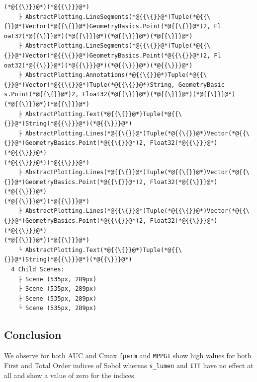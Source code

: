 \documentclass[12pt,a4paper]{article}
\begin{document}
\begin{lstlisting}
(*@{{\}}}@*)(*@{{\}}}@*)
    ├ AbstractPlotting.LineSegments(*@{{\{}}@*)Tuple(*@{{\{}}@*)Vector(*@{{\{}}@*)GeometryBasics.Point(*@{{\{}}@*)2, Fl
oat32(*@{{\}}}@*)(*@{{\}}}@*)(*@{{\}}}@*)(*@{{\}}}@*)
    ├ AbstractPlotting.LineSegments(*@{{\{}}@*)Tuple(*@{{\{}}@*)Vector(*@{{\{}}@*)GeometryBasics.Point(*@{{\{}}@*)2, Fl
oat32(*@{{\}}}@*)(*@{{\}}}@*)(*@{{\}}}@*)(*@{{\}}}@*)
    ├ AbstractPlotting.Annotations(*@{{\{}}@*)Tuple(*@{{\{}}@*)Vector(*@{{\{}}@*)Tuple(*@{{\{}}@*)String, GeometryBasic
s.Point(*@{{\{}}@*)2, Float32(*@{{\}}}@*)(*@{{\}}}@*)(*@{{\}}}@*)(*@{{\}}}@*)(*@{{\}}}@*)
    ├ AbstractPlotting.Text(*@{{\{}}@*)Tuple(*@{{\{}}@*)String(*@{{\}}}@*)(*@{{\}}}@*)
    ├ AbstractPlotting.Lines(*@{{\{}}@*)Tuple(*@{{\{}}@*)Vector(*@{{\{}}@*)GeometryBasics.Point(*@{{\{}}@*)2, Float32(*@{{\}}}@*)(*@{{\}}}@*)
(*@{{\}}}@*)(*@{{\}}}@*)
    ├ AbstractPlotting.Lines(*@{{\{}}@*)Tuple(*@{{\{}}@*)Vector(*@{{\{}}@*)GeometryBasics.Point(*@{{\{}}@*)2, Float32(*@{{\}}}@*)(*@{{\}}}@*)
(*@{{\}}}@*)(*@{{\}}}@*)
    ├ AbstractPlotting.Lines(*@{{\{}}@*)Tuple(*@{{\{}}@*)Vector(*@{{\{}}@*)GeometryBasics.Point(*@{{\{}}@*)2, Float32(*@{{\}}}@*)(*@{{\}}}@*)
(*@{{\}}}@*)(*@{{\}}}@*)
    └ AbstractPlotting.Text(*@{{\{}}@*)Tuple(*@{{\{}}@*)String(*@{{\}}}@*)(*@{{\}}}@*)
  4 Child Scenes:
    ├ Scene (535px, 289px)
    ├ Scene (535px, 289px)
    ├ Scene (535px, 289px)
    └ Scene (535px, 289px)
\end{lstlisting}


\subsection{Conclusion}
We observe for both AUC and Cmax \texttt{fperm} and \texttt{MPPGI} show high values for both First and Total Order indices of Sobol whereas \texttt{s\_lumen} and \texttt{ITT} have no effect at all and show a value of zero for the indices.
\end{document}
